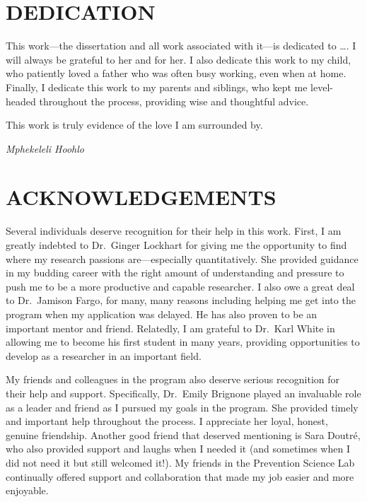 \documentclass[]{DissertateUSU}
\begin{document}
\singlespacing

\newpage

 \fancyhead[R]{\thepage} \fancyfoot[C]{}
\chapter*{DEDICATION} 

This work---the dissertation and all work associated with it---is
dedicated to \ldots. I will always be grateful to her and for her. I
also dedicate this work to my child, who patiently loved a father who
was often busy working, even when at home. Finally, I dedicate this work
to my parents and siblings, who kept me level-headed throughout the
process, providing wise and thoughtful advice.

This work is truly evidence of the love I am surrounded by.

\hspace{10.5 cm} \emph{Mphekeleli Hoohlo}

\newpage

 \fancyhead[R]{\thepage} \fancyfoot[C]{}
\chapter*{ACKNOWLEDGEMENTS}

Several individuals deserve recognition for their help in this work.
First, I am greatly indebted to Dr.~Ginger Lockhart for giving me the
opportunity to find where my research passions are---especially
quantitatively. She provided guidance in my budding career with the
right amount of understanding and pressure to push me to be a more
productive and capable researcher. I also owe a great deal to
Dr.~Jamison Fargo, for many, many reasons including helping me get into
the program when my application was delayed. He has also proven to be an
important mentor and friend. Relatedly, I am grateful to Dr.~Karl White
in allowing me to become his first student in many years, providing
opportunities to develop as a researcher in an important field.

My friends and colleagues in the program also deserve serious
recognition for their help and support. Specifically, Dr.~Emily Brignone
played an invaluable role as a leader and friend as I pursued my goals
in the program. She provided timely and important help throughout the
process. I appreciate her loyal, honest, genuine friendship. Another
good friend that deserved mentioning is Sara Doutré, who also provided
support and laughs when I needed it (and sometimes when I did not need
it but still welcomed it!). My friends in the Prevention Science Lab
continually offered support and collaboration that made my job easier
and more enjoyable.
\end{document}
